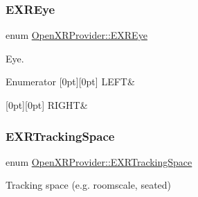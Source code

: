 \subsubsection{\texorpdfstring{EXREye}{EXREye}}
{\footnotesize\ttfamily enum \mbox{\hyperlink{namespace_open_x_r_provider_a8aa379869e30772896e6c468eb54f155}{Open\+X\+R\+Provider\+::\+E\+X\+R\+Eye}}}



Eye. 

\begin{DoxyEnumFields}{Enumerator}
[0pt][0pt]{}\mbox{\label{namespace_open_x_r_provider_a8aa379869e30772896e6c468eb54f155a81ab813676876f34a0aa640d9b3da242}} 
L\+E\+FT&\\
\hline

[0pt][0pt]{}\mbox{\label{namespace_open_x_r_provider_a8aa379869e30772896e6c468eb54f155a6306b44e379151146b66ee8100703cb0}} 
R\+I\+G\+HT&\\
\hline

\end{DoxyEnumFields}
\mbox{\label{namespace_open_x_r_provider_a005dd91723b05b123b8fccbc41798b05}} 
\subsubsection{\texorpdfstring{EXRTrackingSpace}{EXRTrackingSpace}}
{\footnotesize\ttfamily enum \mbox{\hyperlink{namespace_open_x_r_provider_a005dd91723b05b123b8fccbc41798b05}{Open\+X\+R\+Provider\+::\+E\+X\+R\+Tracking\+Space}}}



Tracking space (e.\+g. roomscale, seated) 

